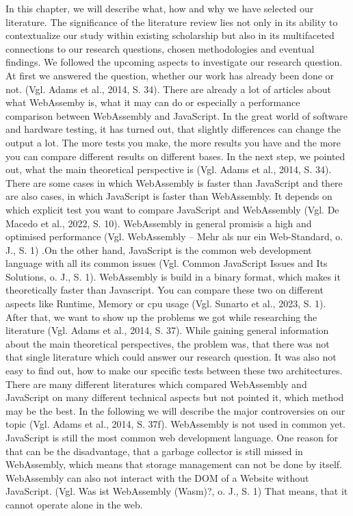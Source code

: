 In this chapter, we will describe what, how and why we have selected our literature. 
The significance of the literature review lies not only in its ability to contextualize our study within existing scholarship but also in its multifaceted connections to our research questions, chosen methodologies and eventual findings. We followed the upcoming aspects to investigate our research question. At first we answered the question, whether our work has already been done or not. (Vgl. Adams et al., 2014, S. 34). There are already a lot of articles about what WebAssemby is, what it may can do or especially a performance comparison between WebAssembly and JavaScript. In the great world of software and hardware testing, it has turned out, that slightly differences can change the output a lot. The more tests you make, the more results you have and the more you can compare different results on different bases.
In the next step, we pointed out, what the main theoretical perspective is (Vgl. Adams et al., 2014, S. 34). There are some cases in which WebAssembly is faster than JavaScript and there are also cases, in which JavaScript is faster than WebAssembly. It depends on which explicit test you want to compare JavaScript and WebAssembly (Vgl. De Macedo et al., 2022, S. 10). WebAssembly in general promisis a high and optimised performance (Vgl. WebAssembly – Mehr als nur ein Web-Standard, o. J., S. 1) .On the other hand, JavaScript is the common web development language with all its common issues (Vgl. Common JavaScript Issues and Its Solutions, o. J., S. 1). WebAssembly is build in a binary format, which makes it theoretically faster than Javascript. You can compare these two  on different aspects like Runtime, Memory or cpu usage (Vgl. Sunarto et al., 2023, S. 1).
After that, we want to show up the problems we got while researching the literature (Vgl. Adams et al., 2014, S. 37). While gaining general information about the main theoretical perspectives, the problem was, that there was not that single literature which could answer our research question. It was also not easy to find out, how to make our specific tests between these two architectures. There are many different literatures which compared WebAssembly and JavaScript on many different technical aspects but not pointed it, which method may be the best.
In the following we will describe the major controversies on our topic (Vgl. Adams et al., 2014, S. 37f). WebAssembly is not used in common yet. JavaScript is still the most common web development language. One reason for that can be the disadvantage, that a garbage collector is still missed in WebAssembly, which means that storage management can not be done by itself. WebAssembly can also not interact with the DOM of a Website without JavaScript. (Vgl. Was ist WebAssembly (Wasm)?, o. J., S. 1)  That means, that it cannot operate alone in the web.
